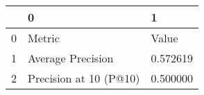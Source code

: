 \begin{tabular}{lll}
\toprule
 & 0 & 1 \\
\midrule
0 & Metric & Value \\
1 & Average Precision & 0.572619 \\
2 & Precision at 10 (P@10) & 0.500000 \\
\bottomrule
\end{tabular}
